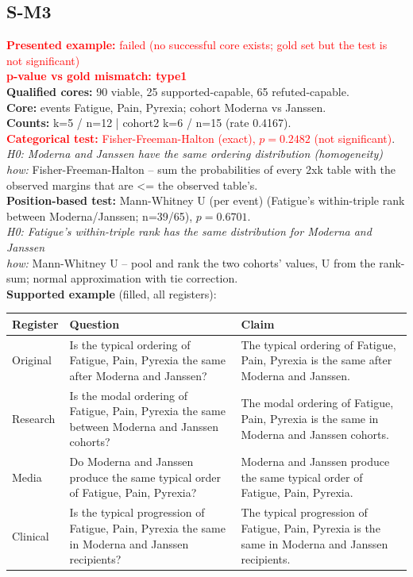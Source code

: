 \documentclass[11pt]{article}
\begin{document}
\subsection*{S-M3}
\textcolor{red}{\textbf{Presented example:} failed (no successful core exists; gold set but the test is not significant)} \\
\textcolor{red}{\textbf{p-value vs gold mismatch: type1}} \\
\textbf{Qualified cores:} 90 viable, 25 supported-capable, 65 refuted-capable. \\
\textbf{Core:} events Fatigue, Pain, Pyrexia; cohort Moderna vs Janssen. \\
\textbf{Counts:} k=5 / n=12  |  cohort2 k=6 / n=15  (rate 0.4167). \\
\textcolor{red}{\textbf{Categorical test:} Fisher-Freeman-Halton (exact), $p = 0.2482$ (not significant)}. \\
\emph{H0: Moderna and Janssen have the same ordering distribution (homogeneity)} \\
\emph{how:} Fisher-Freeman-Halton -- sum the probabilities of every 2xk table with the observed margins that are <= the observed table's. \\
\textbf{Position-based test:} Mann-Whitney U (per event) (Fatigue's within-triple rank between Moderna/Janssen; n=39/65), $p = 0.6701$. \\
\emph{H0: Fatigue's within-triple rank has the same distribution for Moderna and Janssen} \\
\emph{how:} Mann-Whitney U -- pool and rank the two cohorts' values, U from the rank-sum; normal approximation with tie correction. \\
\textbf{Supported example} (filled, all registers): \\
\begin{tabularx}{\linewidth}{@{}l L L@{}}
\toprule
\textbf{Register} & \textbf{Question} & \textbf{Claim} \\
\midrule
Original & Is the typical ordering of Fatigue, Pain, Pyrexia the same after Moderna and Janssen? & The typical ordering of Fatigue, Pain, Pyrexia is the same after Moderna and Janssen. \\
Research & Is the modal ordering of Fatigue, Pain, Pyrexia the same between Moderna and Janssen cohorts? & The modal ordering of Fatigue, Pain, Pyrexia is the same in Moderna and Janssen cohorts. \\
Media & Do Moderna and Janssen produce the same typical order of Fatigue, Pain, Pyrexia? & Moderna and Janssen produce the same typical order of Fatigue, Pain, Pyrexia. \\
Clinical & Is the typical progression of Fatigue, Pain, Pyrexia the same in Moderna and Janssen recipients? & The typical progression of Fatigue, Pain, Pyrexia is the same in Moderna and Janssen recipients. \\
\bottomrule
\end{tabularx}
\vspace{3pt}
\end{document}
